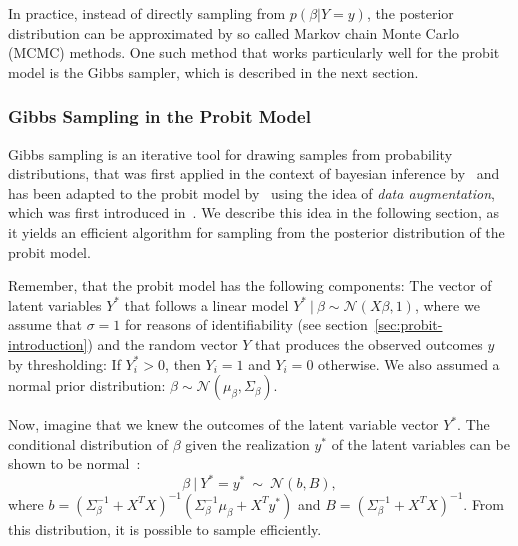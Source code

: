 In practice, instead of directly sampling from $p(\beta | Y=y)$,
the posterior distribution can be approximated by so called
Markov chain Monte Carlo (MCMC) methods.
One such method that works particularly well for the probit model
is the Gibbs sampler, which is described in the next section.

\subsubsection{Gibbs Sampling in the Probit Model}

Gibbs sampling is an iterative tool for drawing samples from
probability distributions, that was first applied in the
context of bayesian
inference by~\cite{gibbs-sampler} and has been adapted to the
probit model by~\cite{gibbs-probit-albert-chib} using the idea
of \textit{data augmentation}, which was first introduced
in~\cite{data-augmentation}.
We describe this idea in the following section, as it yields
an efficient algorithm for sampling from the posterior
distribution of the probit model.

Remember, that the probit model has the following components: The vector of latent
variables $Y^\ast$ that follows a linear model
$Y^\ast\ |\ \beta\sim \mathcal{N}(X \beta, 1)$, where we assume that $\sigma=1$
for reasons of identifiability (see section~\ref{sec:probit-introduction})
and the random vector $Y$ that produces the observed outcomes $y$ by
thresholding: If $Y_i^\ast > 0$, then $Y_i=1$ and $Y_i=0$ otherwise.
We also assumed a normal prior distribution:
$\beta \sim \mathcal{N}(\mu_\beta, \Sigma_\beta)$.

Now, imagine that we knew the outcomes of the latent variable vector $Y^\ast$.
The conditional distribution of $\beta$ given the realization $y^\ast$
of the latent variables can be shown to be normal~\cite{gibbs-probit-albert-chib}:
\begin{equation}
    \label{eq:gibbs-normal}
    \beta\ |\ Y^\ast = y^\ast\ \sim\ \mathcal{N}(b, B),
\end{equation}
where
$b = (\Sigma_\beta^{-1} + X^TX)^{-1}(\Sigma_\beta^{-1} \mu_\beta + X^T y^\ast)$
and
$B = (\Sigma_\beta^{-1} + X^TX)^{-1}$.
From this distribution, it is possible to sample efficiently.

